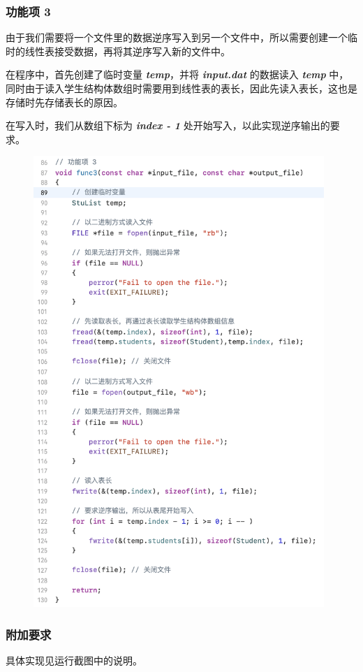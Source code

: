             \subsubsection*{功能项 3}
                \par 由于我们需要将一个文件里的数据逆序写入到另一个文件中，所以需要创建一个临时的线性表接受数据，再将其逆序写入新的文件中。
                \par 在程序中，首先创建了临时变量 \textbf{\textit{temp}}，并将 \textbf{\textit{input.dat}} 的数据读入 \textbf{\textit{temp}} 中，同时由于读入学生结构体数组时需要用到线性表的表长，因此先读入表长，这也是存储时先存储表长的原因。
                \par 在写入时，我们从数组下标为 \textbf{\textit{index - 1}} 处开始写入，以此实现逆序输出的要求。
                \begin{figure}[htbp]
                    \includegraphics*[width = 11cm]{work1_s6.png}
                \end{figure}
            \subsubsection*{附加要求}
                \par 具体实现见运行截图中的说明。
